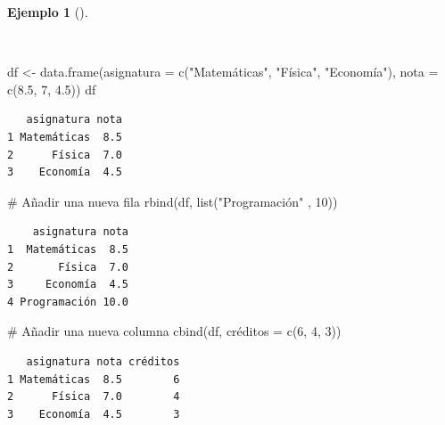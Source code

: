 \documentclass[
  spanish,
  a4paper,
]{scrreport}
\newenvironment{Shaded}{\begin{snugshade}}{\end{snugshade}}
\newcommand{\AttributeTok}[1]{\textcolor[rgb]{0.40,0.45,0.13}{#1}}
\newcommand{\CommentTok}[1]{\textcolor[rgb]{0.37,0.37,0.37}{#1}}
\newcommand{\DecValTok}[1]{\textcolor[rgb]{0.68,0.00,0.00}{#1}}
\newcommand{\FloatTok}[1]{\textcolor[rgb]{0.68,0.00,0.00}{#1}}
\newcommand{\FunctionTok}[1]{\textcolor[rgb]{0.28,0.35,0.67}{#1}}
\newcommand{\NormalTok}[1]{\textcolor[rgb]{0.00,0.23,0.31}{#1}}
\newcommand{\OtherTok}[1]{\textcolor[rgb]{0.00,0.23,0.31}{#1}}
\newcommand{\StringTok}[1]{\textcolor[rgb]{0.13,0.47,0.30}{#1}}
\theoremstyle{definition}
\theoremstyle{definition}
\newtheorem{example}{Ejemplo}[chapter]
\theoremstyle{remark}
\begin{document}
\begin{example}[]\protect\hypertarget{exm-añadir-filas-columnas-data-frame}{}\label{exm-añadir-filas-columnas-data-frame}

~

\begin{Shaded}
\begin{Highlighting}[]
\NormalTok{df }\OtherTok{\textless{}{-}} \FunctionTok{data.frame}\NormalTok{(}\AttributeTok{asignatura =} \FunctionTok{c}\NormalTok{(}\StringTok{"Matemáticas"}\NormalTok{, }\StringTok{"Física"}\NormalTok{, }\StringTok{"Economía"}\NormalTok{), }\AttributeTok{nota =} \FunctionTok{c}\NormalTok{(}\FloatTok{8.5}\NormalTok{, }\DecValTok{7}\NormalTok{, }\FloatTok{4.5}\NormalTok{))}
\NormalTok{df}
\end{Highlighting}
\end{Shaded}

\begin{verbatim}
   asignatura nota
1 Matemáticas  8.5
2      Física  7.0
3    Economía  4.5
\end{verbatim}

\begin{Shaded}
\begin{Highlighting}[]
\CommentTok{\# Añadir una nueva fila}
\FunctionTok{rbind}\NormalTok{(df, }\FunctionTok{list}\NormalTok{(}\StringTok{"Programación"}\NormalTok{ , }\DecValTok{10}\NormalTok{))}
\end{Highlighting}
\end{Shaded}

\begin{verbatim}
    asignatura nota
1  Matemáticas  8.5
2       Física  7.0
3     Economía  4.5
4 Programación 10.0
\end{verbatim}

\begin{Shaded}
\begin{Highlighting}[]
\CommentTok{\# Añadir una nueva columna}
\FunctionTok{cbind}\NormalTok{(df, créditos }\OtherTok{=} \FunctionTok{c}\NormalTok{(}\DecValTok{6}\NormalTok{, }\DecValTok{4}\NormalTok{, }\DecValTok{3}\NormalTok{))}
\end{Highlighting}
\end{Shaded}

\begin{verbatim}
   asignatura nota créditos
1 Matemáticas  8.5        6
2      Física  7.0        4
3    Economía  4.5        3
\end{verbatim}

\end{example}
\end{document}
